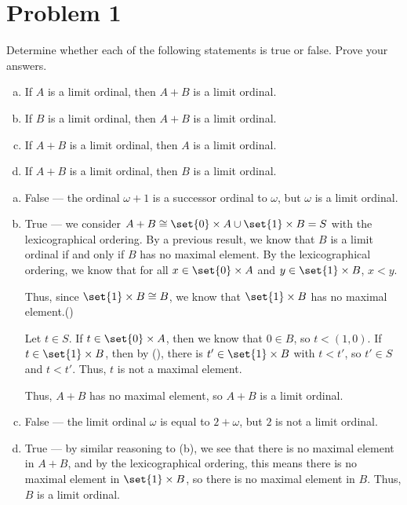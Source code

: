 \documentclass[10pt]{mypackage}
\begin{document}
\RaggedRight
\section{Problem 1}%
\begin{problem}
  Determine whether each of the following statements is true or false. Prove your answers.
  \begin{enumerate}[(a)]
    \item If $A$ is a limit ordinal, then $A+B$ is a limit ordinal.
    \item If $B$ is a limit ordinal, then $A+B$ is a limit ordinal.
    \item If $A+B$ is a limit ordinal, then $A$ is a limit ordinal.
    \item If $A+B$ is a limit ordinal, then $B$ is a limit ordinal.
  \end{enumerate}
\end{problem}
\begin{solution}\hfill
  \begin{enumerate}[(a)]
    \item False --- the ordinal $\omega + 1$ is a successor ordinal to $\omega$, but $\omega$ is a limit ordinal.
    \item True --- we consider $A+B \cong \set{0}\times A \cup \set{1}\times B = S$ with the lexicographical ordering. By a previous result, we know that $B$ is a limit ordinal if and only if $B$ has no maximal element. By the lexicographical ordering, we know that for all $x\in \set{0}\times A$ and $y\in \set{1}\times B$, $x < y$.\newline

      Thus, since $\set{1}\times B\cong B$, we know that $\set{1}\times B$ has no maximal element.\hfill  (\textasteriskcentered)\break

      Let $t\in S$. If $t\in \set{0}\times A$, then we know that $0\in B$, so $t < (1,0)$. If $t\in \set{1}\times B$, then by (\textasteriskcentered), there is $t'\in \set{1}\times B$ with $t < t'$, so $t'\in S$ and $t < t'$. Thus, $t$ is not a maximal element.\newline

      Thus, $A+B$ has no maximal element, so $A+B$ is a limit ordinal.
    \item False --- the limit ordinal $\omega$ is equal to $2 + \omega$, but $2$ is not a limit ordinal.
    \item True --- by similar reasoning to (b), we see that there is no maximal element in $A + B$, and by the lexicographical ordering, this means there is no maximal element in $\set{1}\times B$, so there is no maximal element in $B$. Thus, $B$ is a limit ordinal.
  \end{enumerate}
\end{solution}
\end{document}
